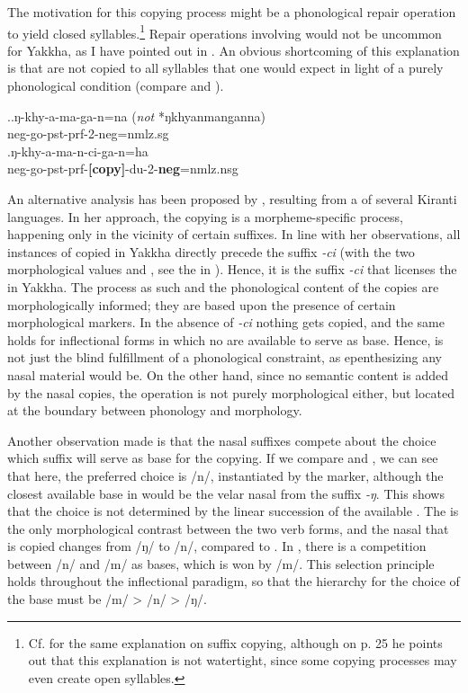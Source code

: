 	
The motivation for this copying process might be a phonological repair operation to yield closed syllables.\footnote{Cf. \citet[22]{Schikowski2012_Morphology} for the same explanation on  suffix copying, although on p. 25 he points out that this explanation is not watertight, since some copying processes may even create open syllables.} Repair operations involving  would not be uncommon for Yakkha, as I have pointed out in . An obvious shortcoming of this explanation is that  are not copied to all syllables that one would expect in light of a purely phonological condition (compare \Next[a] and \Next[b]). 


\ex.\ag.ŋ-khy-a-ma-ga-n=na (\emph{not} *ŋkhyanmanganna)\\
{\sc neg-}go{\sc -pst-prf-2-neg=nmlz.sg}\\
\bg.ŋ-khy-a-ma-n-ci-ga-n=ha\\
{\sc neg-}go{\sc -pst-prf-{\bf [copy]}-du-2-{\bf neg}=nmlz.nsg}\\


An alternative analysis has been proposed by \citet{Zimmermann2012_Affix}, resulting from a  of several Kiranti languages. In her approach, the copying is a morpheme-specific process, happening only in the vicinity of certain suffixes. In line with her observations, all instances of copied  in Yakkha directly precede the suffix  \emph{-ci} (with the two morphological values  and , see the  in ). Hence, it is the suffix \emph{-ci} that licenses the  in Yakkha. The process as such and the phonological content of the copies are morphologically informed; they are based upon the presence of certain morphological markers. In the absence of \emph{-ci} nothing gets copied, and the same holds for inflectional forms in which no  are available to serve as base. Hence,  is not just the blind fulfillment of a phonological constraint, as epenthesizing any nasal material would be. On the other hand, since no semantic content is added by the nasal copies, the operation is not purely morphological either, but located at the boundary between phonology and morphology.


Another observation made is that the nasal suffixes compete about the choice which suffix will serve as base for the copying. If we compare \Next[a] and \Next[b], we can see that here, the preferred choice is /n/, instantiated by  the  marker, although the closest available base in \Next[b] would be the velar nasal from the suffix \emph{-ŋ}. This shows that the choice is not determined by the linear succession of the available . The  is the only morphological contrast between the two verb forms, and the nasal that is copied changes from /ŋ/ to /n/, compared to \Next[a].  In \Next[c], there is a competition between /n/ and /m/ as bases, which is won by /m/. This selection principle holds throughout the inflectional paradigm, so that the hierarchy for the choice of the base must be /m/ > /n/ > /ŋ/.


